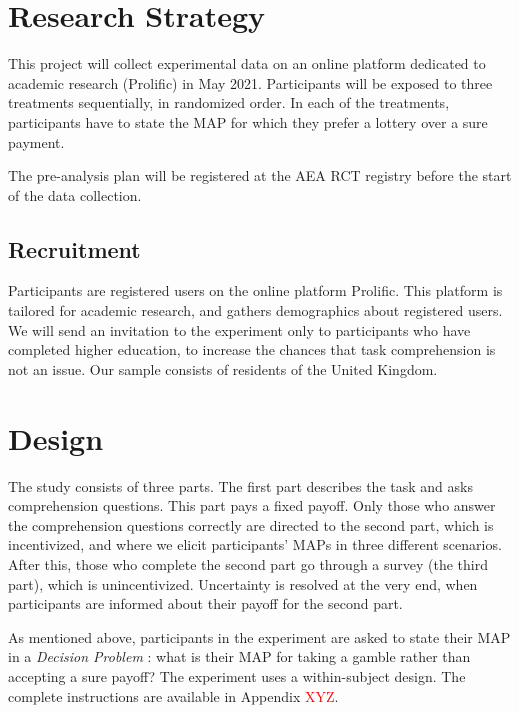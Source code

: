 \section{Research Strategy}
This project will collect experimental data on an online platform dedicated to academic research (Prolific) in May 2021. Participants will be exposed to three treatments sequentially, in randomized order.
In each of the treatments, participants have to state the MAP for which they prefer a lottery over a sure payment.

The pre-analysis plan will be registered at the AEA RCT registry before the start of the data collection.


\subsection{Recruitment}
Participants are registered users on the online platform Prolific.
This platform is tailored for academic research, and gathers demographics about registered users.
We will send an invitation to the experiment only to participants who have completed higher education, to increase the chances that task comprehension is not an issue.
Our sample consists of residents of the United Kingdom.



\section{Design}
The study consists of three parts.
The first part describes the task and asks comprehension questions.
This part pays a fixed payoff.
Only those who answer the comprehension questions correctly are directed to the second part, which is incentivized, and where we elicit participants' MAPs in three different scenarios.
After this, those who complete the second part go through a survey (the third part), which is unincentivized.
Uncertainty is resolved at the very end, when participants are informed about their payoff for the second part.

As mentioned above, participants in the experiment are asked to state their MAP in a \textit{Decision Problem} \citep{Bohnet2004}: what is their MAP for taking a gamble rather than accepting a sure payoff?
The experiment uses a within-subject design.
The complete instructions are available in Appendix \textcolor{red}{XYZ}.


